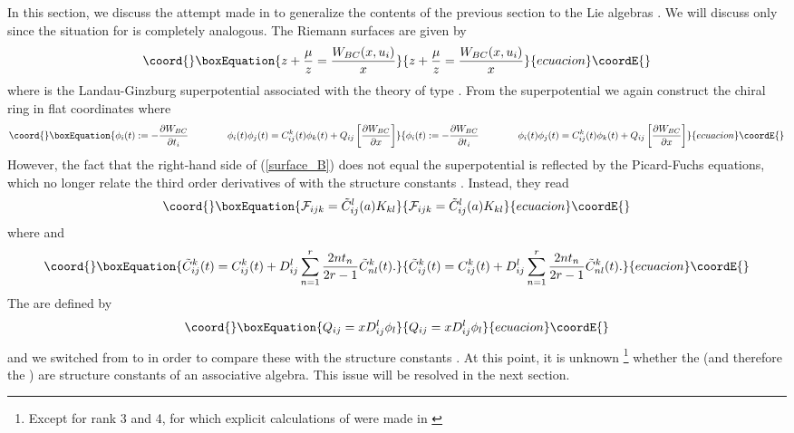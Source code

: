 \documentclass[a4paper,11pt]{article}
\numberwithin{equation}{section}
\begin{document}
In this section, we discuss the attempt made in \cite{ITO-YANG:1998} to
generalize the contents of the previous section to the Lie algebras \coordHE{}. We will discuss only \coordHE{} since the situation for \coordHE{}
is completely analogous. The Riemann surfaces are given by 
\begin{equation}\coord{}\boxEquation{
z+\dfrac{\mu }{z}=\dfrac{W_{BC}(x,u_{i})}{x}  \label{surface_B}
}{
z+\dfrac{\mu }{z}=\dfrac{W_{BC}(x,u_{i})}{x}  }{ecuacion}\coordE{}\end{equation}
where \coordHE{} is the Landau-Ginzburg superpotential associated with the
theory of type \coordHE{}. From the superpotential we again construct the chiral
ring in flat coordinates where 
\begin{equation}\coord{}\boxEquation{
\phi _{i}(t):=-\dfrac{\partial W_{BC}}{\partial t_{i}}\qquad \qquad \phi
_{i}(t)\phi _{j}(t)=C_{ij}^{k}(t)\phi _{k}(t)+Q_{ij}\left[ \dfrac{\partial
W_{BC}}{\partial x}\right] 
\label{chiralB}
}{
\phi _{i}(t):=-\dfrac{\partial W_{BC}}{\partial t_{i}}\qquad \qquad \phi
_{i}(t)\phi _{j}(t)=C_{ij}^{k}(t)\phi _{k}(t)+Q_{ij}\left[ \dfrac{\partial
W_{BC}}{\partial x}\right] 
}{ecuacion}\coordE{}\end{equation}
However, the fact that the right-hand side of (\ref{surface_B}) does not
equal the superpotential is reflected by the Picard-Fuchs equations, which
no longer relate the third order derivatives of \coordHE{} with the
structure constants \coordHE{}. Instead, they read 
\begin{equation}\coord{}\boxEquation{
\mathcal{F}_{ijk}=\tilde{C}_{ij}^{l}(a)K_{kl}
}{
\mathcal{F}_{ijk}=\tilde{C}_{ij}^{l}(a)K_{kl}
}{ecuacion}\coordE{}\end{equation}
where \coordHE{} and 
\begin{equation}\coord{}\boxEquation{
\tilde{C}_{ij}^{k}(t)=C_{ij}^{k}(t)+D_{ij}^{l}\sum_{n=1}^{r}\dfrac{2nt_{n}}{
2r-1}\tilde{C}_{nl}^{k}(t).  \label{Ctilde}
}{
\tilde{C}_{ij}^{k}(t)=C_{ij}^{k}(t)+D_{ij}^{l}\sum_{n=1}^{r}\dfrac{2nt_{n}}{
2r-1}\tilde{C}_{nl}^{k}(t).  }{ecuacion}\coordE{}\end{equation}
The \coordHE{} are defined by 
\begin{equation}\coord{}\boxEquation{
Q_{ij}=xD_{ij}^{l}\phi _{l}  \label{D}
}{
Q_{ij}=xD_{ij}^{l}\phi _{l}  }{ecuacion}\coordE{}\end{equation}
and we switched from \coordHE{} to \coordHE{} in order to compare these with
the structure constants \coordHE{}. At this point, it is unknown%
\footnote{%
Except for rank 3 and 4, for which explicit calculations of \coordHE{} were made in \cite{ITO-YANG:1998}} whether the \coordHE{} (and therefore the \coordHE{}) are structure
constants of an associative algebra. This issue will be resolved in the next
section.
\end{document}
